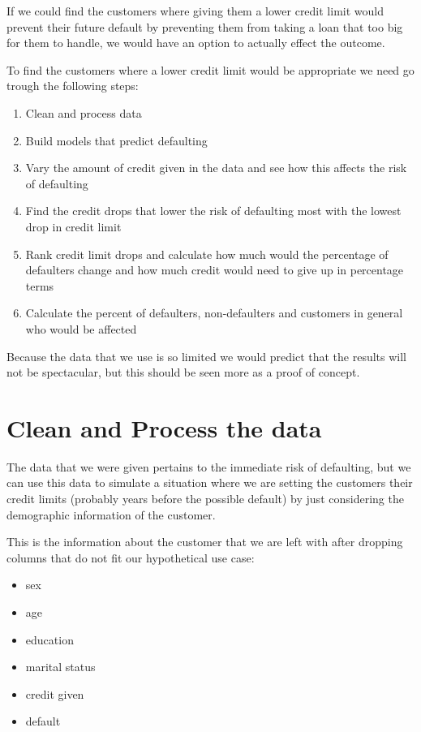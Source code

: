 \documentclass[12pt,a4paper,leqno]{report}
\theoremstyle{plain}
\theoremstyle{definition}
\theoremstyle{remark}
\begin{document}
If we could find the customers where giving them a lower credit limit
would prevent their future default by preventing them from taking
a loan that too big for them to handle, we would have an option
to actually effect the outcome.

To find the customers where a lower credit limit would be appropriate
we need go trough the following steps:

\begin{enumerate}
    \item Clean and process data
    \item Build models that predict defaulting
    \item Vary the amount of credit given in the data and see how this affects
    the risk of defaulting
    \item Find the credit drops that lower the risk of defaulting most with
    the lowest drop in credit limit
    \item Rank credit limit drops and calculate how much would the percentage of
    defaulters change and how much credit would need to give up in percentage terms
    \item Calculate the percent of defaulters, non-defaulters and customers in
    general who would be affected
\end{enumerate}

Because the data that we use is so limited we would predict that
the results will not be spectacular, but this should be seen more
as a proof of concept.

\section{Clean and Process the data}

The data that we were given pertains to the immediate risk of defaulting,
but we can use this data to simulate a situation where we are
setting the customers their credit limits (probably years before the possible
default) by just considering the demographic information of the customer.

This is the information about the customer that we are left with after
dropping columns that do not fit our hypothetical use case:

\begin{itemize}
    \item sex
    \item age
    \item education
    \item marital status
    \item credit given
    \item default
\end{itemize}
\end{document}
